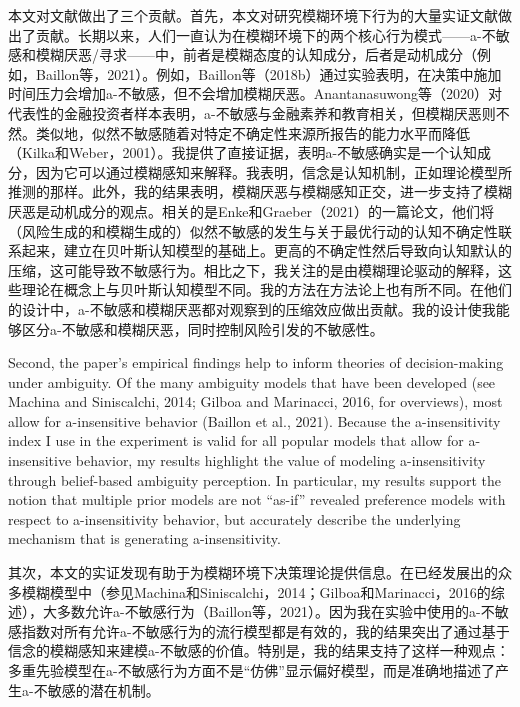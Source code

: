 \documentclass[12pt,a4paper]{article}
\newenvironment{original}
  {\par\medskip\noindent\color{black}\ignorespaces}
  {\par\medskip}
\newenvironment{translation}
  {\par\noindent\color{transblue}\ignorespaces}
  {\par\medskip\medskip}
\begin{document}
\begin{translation}
本文对文献做出了三个贡献。首先，本文对研究模糊环境下行为的大量实证文献做出了贡献。长期以来，人们一直认为在模糊环境下的两个核心行为模式——a-不敏感和模糊厌恶/寻求——中，前者是模糊态度的认知成分，后者是动机成分（例如，Baillon等，2021）。例如，Baillon等（2018b）通过实验表明，在决策中施加时间压力会增加a-不敏感，但不会增加模糊厌恶。Anantanasuwong等（2020）对代表性的金融投资者样本表明，a-不敏感与金融素养和教育相关，但模糊厌恶则不然。类似地，似然不敏感随着对特定不确定性来源所报告的能力水平而降低（Kilka和Weber，2001）。我提供了直接证据，表明a-不敏感确实是一个认知成分，因为它可以通过模糊感知来解释。我表明，信念是认知机制，正如理论模型所推测的那样。此外，我的结果表明，模糊厌恶与模糊感知正交，进一步支持了模糊厌恶是动机成分的观点。相关的是Enke和Graeber（2021）的一篇论文，他们将（风险生成的和模糊生成的）似然不敏感的发生与关于最优行动的认知不确定性联系起来，建立在贝叶斯认知模型的基础上。更高的不确定性然后导致向认知默认的压缩，这可能导致不敏感行为。相比之下，我关注的是由模糊理论驱动的解释，这些理论在概念上与贝叶斯认知模型不同。我的方法在方法论上也有所不同。在他们的设计中，a-不敏感和模糊厌恶都对观察到的压缩效应做出贡献。我的设计使我能够区分a-不敏感和模糊厌恶，同时控制风险引发的不敏感性。
\end{translation}

\begin{original}
Second, the paper's empirical findings help to inform theories of decision-making under ambiguity. Of the many ambiguity models that have been developed (see Machina and Siniscalchi, 2014; Gilboa and Marinacci, 2016, for overviews), most allow for a-insensitive behavior (Baillon et al., 2021). Because the a-insensitivity index I use in the experiment is valid for all popular models that allow for a-insensitive behavior, my results highlight the value of modeling a-insensitivity through belief-based ambiguity perception. In particular, my results support the notion that multiple prior models are not ``as-if'' revealed preference models with respect to a-insensitivity behavior, but accurately describe the underlying mechanism that is generating a-insensitivity.
\end{original}

\begin{translation}
其次，本文的实证发现有助于为模糊环境下决策理论提供信息。在已经发展出的众多模糊模型中（参见Machina和Siniscalchi，2014；Gilboa和Marinacci，2016的综述），大多数允许a-不敏感行为（Baillon等，2021）。因为我在实验中使用的a-不敏感指数对所有允许a-不敏感行为的流行模型都是有效的，我的结果突出了通过基于信念的模糊感知来建模a-不敏感的价值。特别是，我的结果支持了这样一种观点：多重先验模型在a-不敏感行为方面不是``仿佛''显示偏好模型，而是准确地描述了产生a-不敏感的潜在机制。
\end{translation}
\end{document}

